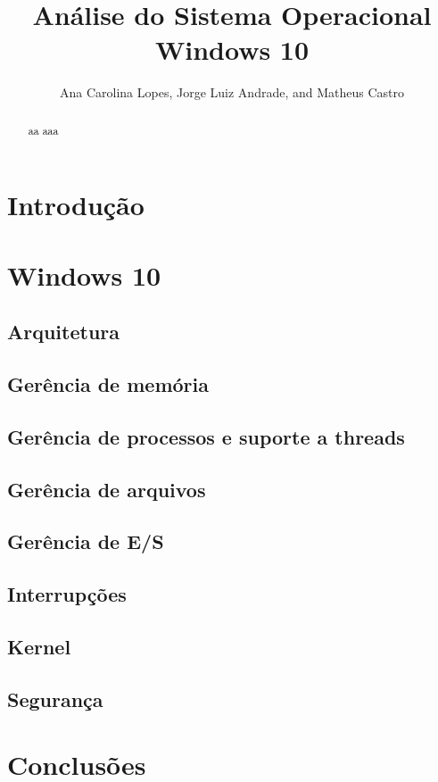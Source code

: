 \documentclass[journal]{IEEEtran}
\title{Análise do Sistema Operacional Windows 10}
\author{Ana Carolina Lopes,
	Jorge Luiz Andrade,
	and Matheus Castro}%
\begin{document}
 
	
	\maketitle
	
	\begin{abstract} 
		aa aaa\cite{internals_pt1}
	\end{abstract}
	
	\section{Introdução}
	
	
	\section{Windows 10}
	
	\subsection{Arquitetura}
	
	
	\subsection{Gerência de memória}
	
	
	\subsection{Gerência de processos e suporte a threads}
	
	
	\subsection{Gerência de arquivos}
	 
	
	\subsection{Gerência de E/S}
	
	
	\subsection{Interrupções}
	
	
	\subsection{Kernel}
	 
	
	\subsection{Segurança}
	
	
	\section{Conclusões}
	
	
	
	
	
\end{document}
